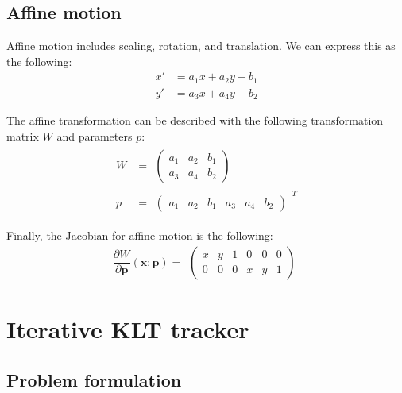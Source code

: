 \documentclass{article}
\begin{document}
\subsection{Affine motion}
Affine motion includes scaling, rotation, and translation.
We can express this as the following:
\begin{equation}
  \begin{aligned}
    x' &= a_1 x + a_2 y + b_1 \\
        y' &= a_3 x + a_4 y + b_2
  \end{aligned}
\end{equation}

The affine transformation can be described with the following transformation matrix $W$ and parameters $p$:
\begin{equation}
  \begin{aligned}
    W &= \begin{matrix}
      \begin{pmatrix}
        a_1 & a_2 & b_1 \\
                a_3 & a_4 & b_2
      \end{pmatrix}
    \end{matrix}\\
        p &= \begin{matrix}
          \begin{pmatrix}
            a_1 & a_2 & b_1 & a_3 & a_4 & b_2
          \end{pmatrix}
        \end{matrix} ^ T
  \end{aligned}
\end{equation}

Finally, the Jacobian for affine motion is the following:
\begin{equation}
  \frac{\partial W}{\partial \bm{p}} (\bm{x} ; \bm{p}) = \begin{matrix}
    \begin{pmatrix}
      x & y & 1 & 0 & 0 & 0 \\
            0 & 0 & 0 & x & y & 1
    \end{pmatrix}
  \end{matrix}
\end{equation}

\section{Iterative KLT tracker}
\subsection{Problem formulation}
\end{document}
